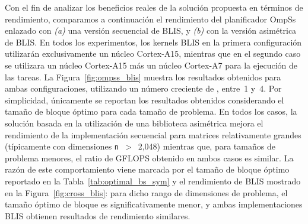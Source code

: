 Con el fin de analizar los beneficios reales de la solución propuesta en
términos de rendimiento, comparamos a continuación el rendimiento del
planificador OmpSs enlazado con {\em (a)} una versión secuencial de BLIS, y
{\em (b)} con la versión asimétrica de BLIS.  En todos los experimentos,
los kernels BLIS en la primera configuración utilizarán exclusivamente un
núcleo Cortex-A15, mientras que en el segundo caso se utilizara un núcleo
Cortex-A15 más un núcleo Cortex-A7 para la ejecución de las tareas.
%
La Figura~\ref{fig:ompss_blis} muestra los resultados obtenidos para ambas
configuraciones, utilizando un número creciente de \wts, entre~1 y~4. Por
simplicidad, únicamente se reportan los resultados obtenidos considerando
el tamaño de bloque óptimo para cada tamaño de problema. En todos los
casos, la solución basada en la utilización de una biblioteca asimétrica
mejora el rendimiento de la implementación secuencial para matrices
relativamente grandes (típicamente con dimensiones {\tt n}~$>$~2,048)
mientras que, para tamaños de problema menores, el ratio de GFLOPS obtenido
en ambos casos es similar.  La razón de este comportamiento viene marcada
por el tamaño de bloque óptimo reportado en la
Tabla~\ref{tab:optimal_bs_sym} y el rendimiento de BLIS mostrado en la
Figura~\ref{fig:cross_blis}: para dicho rango de dimensiones de problema,
el tamaño óptimo de bloque es significativamente menor, y ambas
implementaciones BLIS obtienen resultados de rendimiento similares.

